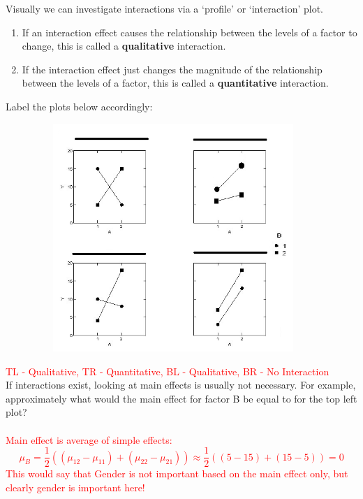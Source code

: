 \newpage

Visually we can investigate interactions via a `profile' or `interaction' plot.
\begin{enumerate}
\item If an interaction effect causes the relationship between the levels of a factor to change, this is called a \textbf{qualitative} interaction.  
\item If the interaction effect just changes the magnitude of the relationship between the levels of a factor, this is called a \textbf{quantitative} interaction.
\end{enumerate}
Label the plots below accordingly:
\begin{center}
\includegraphics[height=3.4in,width=5in]{interact}
\end{center}
\textcolor{red}{TL - Qualitative, TR - Quantitative, BL - Qualitative, BR - No Interaction}\\
If interactions exist, looking at main effects is usually not necessary.  For example, approximately what would the main effect for factor B be equal to for the top left plot?\\~\\
\textcolor{red}{
Main effect is average of simple effects:
$$\mu_B=\frac{1}{2}\left((\mu_{12}-\mu_{11})+(\mu_{22}-\mu_{21})\right)\approx \frac{1}{2}((5-15)+(15-5))=0$$
This would say that Gender is not important based on the main effect only, but clearly gender is important here!}


